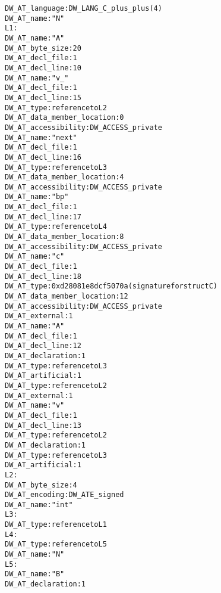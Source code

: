 \begin{alltt}
      DW\_AT\_language: DW\_LANG\_C\_plus\_plus (4)
          DW\_AT\_name: "N"
L1:
             DW\_AT\_name: "A"
             DW\_AT\_byte\_size: 20
             DW\_AT\_decl\_file: 1
             DW\_AT\_decl\_line: 10
                DW\_AT\_name: "v\_"
                DW\_AT\_decl\_file: 1
                DW\_AT\_decl\_line: 15
                DW\_AT\_type: reference to L2
                DW\_AT\_data\_member\_location: 0
                DW\_AT\_accessibility: DW\_ACCESS\_private
               DW\_AT\_name: "next"
               DW\_AT\_decl\_file: 1
               DW\_AT\_decl\_line: 16
               DW\_AT\_type: reference to L3
               DW\_AT\_data\_member\_location: 4
               DW\_AT\_accessibility: DW\_ACCESS\_private
               DW\_AT\_name: "bp"
               DW\_AT\_decl\_file: 1
               DW\_AT\_decl\_line: 17
               DW\_AT\_type: reference to L4
               DW\_AT\_data\_member\_location: 8
               DW\_AT\_accessibility: DW\_ACCESS\_private
               DW\_AT\_name: "c"
               DW\_AT\_decl\_file: 1
               DW\_AT\_decl\_line: 18
               DW\_AT\_type: 0xd28081e8 dcf5070a (signature for struct C)
               DW\_AT\_data\_member\_location: 12
               DW\_AT\_accessibility: DW\_ACCESS\_private
           DW\_AT\_external: 1
           DW\_AT\_name: "A"
           DW\_AT\_decl\_file: 1
           DW\_AT\_decl\_line: 12
           DW\_AT\_declaration: 1
           DW\_AT\_type: reference to L3
           DW\_AT\_artificial: 1
           DW\_AT\_type: reference to L2
           DW\_AT\_external: 1
           DW\_AT\_name: "v"
           DW\_AT\_decl\_file: 1
           DW\_AT\_decl\_line: 13
           DW\_AT\_type: reference to L2
           DW\_AT\_declaration: 1
           DW\_AT\_type: reference to L3
           DW\_AT\_artificial: 1
L2:
         DW\_AT\_byte\_size: 4
         DW\_AT\_encoding: DW\_ATE\_signed
         DW\_AT\_name: "int"
L3:
         DW\_AT\_type: reference to L1
L4:
         DW\_AT\_type: reference to L5
         DW\_AT\_name: "N"
L5:
           DW\_AT\_name: "B"
           DW\_AT\_declaration: 1
\end{alltt}

